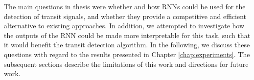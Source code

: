 
The main questions in thesis were whether and how RNNs could be used for the detection of transit signals, and whether they provide a competitive and efficient alternative to existing approaches. In addition, we attempted to investigate how the outputs of the RNN could be made more interpretable for this task, such that it would benefit the transit detection algorithm. In the following, we discuss these questions with regard to the results presented in Chapter \ref{chap:experiments}. The subsequent sections describe the limitations of this work and directions for future work.
